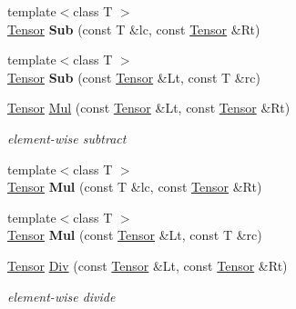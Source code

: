 \begin{DoxyCompactItemize}
\mbox{\label{namespacecytnx_1_1linalg_a4fa0cd62f3723518ae4e46db00d8be50}} 
{\footnotesize template$<$class T $>$ }\\\hyperlink{classcytnx_1_1Tensor}{Tensor} {\bfseries Sub} (const T \&lc, const \hyperlink{classcytnx_1_1Tensor}{Tensor} \&Rt)
\item 
\mbox{\label{namespacecytnx_1_1linalg_a0fa9fc16ad7e8d2685d0acfa25efc479}} 
{\footnotesize template$<$class T $>$ }\\\hyperlink{classcytnx_1_1Tensor}{Tensor} {\bfseries Sub} (const \hyperlink{classcytnx_1_1Tensor}{Tensor} \&Lt, const T \&rc)
\item 
\mbox{\label{namespacecytnx_1_1linalg_a2fc49876b7b53f6f6e97ce70f475f636}} 
\hyperlink{classcytnx_1_1Tensor}{Tensor} \hyperlink{namespacecytnx_1_1linalg_a2fc49876b7b53f6f6e97ce70f475f636}{Mul} (const \hyperlink{classcytnx_1_1Tensor}{Tensor} \&Lt, const \hyperlink{classcytnx_1_1Tensor}{Tensor} \&Rt)
\begin{DoxyCompactList}\small\item\em element-\/wise subtract \end{DoxyCompactList}\item 
\mbox{\label{namespacecytnx_1_1linalg_a2d21f1d35bcecf3e257146540c668779}} 
{\footnotesize template$<$class T $>$ }\\\hyperlink{classcytnx_1_1Tensor}{Tensor} {\bfseries Mul} (const T \&lc, const \hyperlink{classcytnx_1_1Tensor}{Tensor} \&Rt)
\item 
\mbox{\label{namespacecytnx_1_1linalg_a5b2930a8759b8ceb7cd92df6b27bdf24}} 
{\footnotesize template$<$class T $>$ }\\\hyperlink{classcytnx_1_1Tensor}{Tensor} {\bfseries Mul} (const \hyperlink{classcytnx_1_1Tensor}{Tensor} \&Lt, const T \&rc)
\item 
\mbox{\label{namespacecytnx_1_1linalg_abc1940e0e7364299ea1481c81003ba13}} 
\hyperlink{classcytnx_1_1Tensor}{Tensor} \hyperlink{namespacecytnx_1_1linalg_abc1940e0e7364299ea1481c81003ba13}{Div} (const \hyperlink{classcytnx_1_1Tensor}{Tensor} \&Lt, const \hyperlink{classcytnx_1_1Tensor}{Tensor} \&Rt)
\begin{DoxyCompactList}\small\item\em element-\/wise divide \end{DoxyCompactList}\item 

\end{DoxyCompactItemize}
